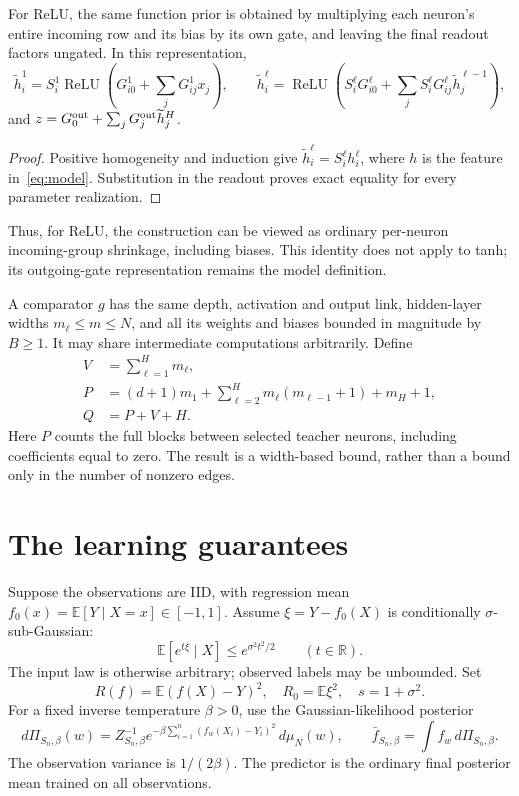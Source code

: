 \documentclass[11pt]{article}
\theoremstyle{remark}\newtheorem{remark}[theorem]{Remark}
\newcommand{\E}{\mathbb E}\newcommand{\R}{\mathbb R}\newcommand{\Pp}{\mathbb P}
\begin{document}
\begin{lemma}\label{lem:row-gates}
For ReLU, the same function prior is obtained by multiplying each neuron's entire incoming row and its bias by its own gate, and leaving the final readout factors ungated. In this representation,
\[
 \widetilde h_i^1=S_i^1\operatorname{ReLU}\!\left(G^1_{i0}+\sum_jG^1_{ij}x_j\right),
 \qquad
 \widetilde h_i^\ell=
 \operatorname{ReLU}\!\left(S_i^\ell G^\ell_{i0}
       +\sum_jS_i^\ell G^\ell_{ij}\widetilde h_j^{\ell-1}\right),
\]
and $z=G^{\rm out}_0+\sum_jG^{\rm out}_j\widetilde h_j^H$.
\end{lemma}
\begin{proof}
Positive homogeneity and induction give $\widetilde h_i^\ell=S_i^\ell h_i^\ell$, where $h$ is the feature in~\eqref{eq:model}. Substitution in the readout proves exact equality for every parameter realization.
\end{proof}
Thus, for ReLU, the construction can be viewed as ordinary per-neuron incoming-group shrinkage, including biases. This identity does not apply to tanh; its outgoing-gate representation remains the model definition.

A comparator $g$ has the same depth, activation and output link, hidden-layer widths $m_\ell\le m\le N$, and all its weights and biases bounded in magnitude by $B\ge1$. It may share intermediate computations arbitrarily. Define
\begin{align}
 V&=\sum_{\ell=1}^H m_\ell,\\
 P&=(d+1)m_1+\sum_{\ell=2}^H m_\ell(m_{\ell-1}+1)+m_H+1,\\
 Q&=P+V+H.
 \label{eq:counts}
\end{align}
Here $P$ counts the full blocks between selected teacher neurons, including coefficients equal to zero. The result is a width-based bound, rather than a bound only in the number of nonzero edges.

\section{The learning guarantees}
Suppose the observations are IID, with regression mean
$f_0(x)=\E[Y\mid X=x]\in[-1,1]$. Assume $\xi=Y-f_0(X)$ is conditionally $\sigma$-sub-Gaussian:
\[
 \E[e^{t\xi}\mid X]\le e^{\sigma^2t^2/2}\qquad(t\in\R).
\]
The input law is otherwise arbitrary; observed labels may be unbounded. Set
\[
 R(f)=\E(f(X)-Y)^2,\quad R_0=\E\xi^2,\quad s=1+\sigma^2.
\]
For a fixed inverse temperature $\beta>0$, use the Gaussian-likelihood posterior
\[
 d\Pi_{S_n,\beta}(w)=Z_{S_n,\beta}^{-1}
 e^{-\beta\sum_{i=1}^n(f_w(X_i)-Y_i)^2}\,d\mu_N(w),
 \qquad \bar f_{S_n,\beta}=\int f_w\,d\Pi_{S_n,\beta}.
\]
The observation variance is $1/(2\beta)$. The predictor is the ordinary final posterior mean trained on all observations.
\end{document}

